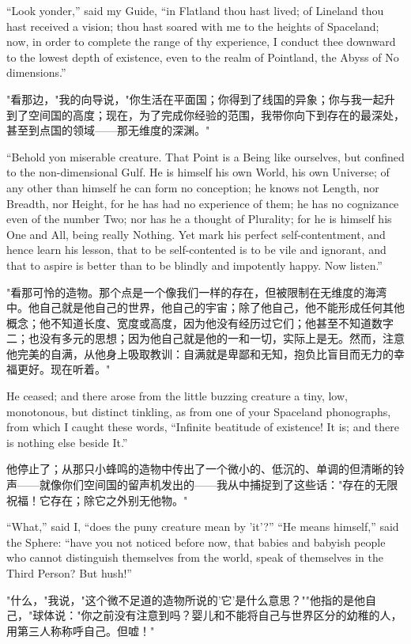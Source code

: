 \documentclass[12pt,UTF8]{ctexbook}
\begin{document}
``Look yonder,'' said my Guide, ``in Flatland thou hast lived; of Lineland thou hast received a vision; thou hast soared with me to the heights of Spaceland; now, in order to complete the range of thy experience, I conduct thee downward to the lowest depth of existence, even to the realm of Pointland, the Abyss of No dimensions.''

"看那边，"我的向导说，"你生活在平面国；你得到了线国的异象；你与我一起升到了空间国的高度；现在，为了完成你经验的范围，我带你向下到存在的最深处，甚至到点国的领域——那无维度的深渊。"

``Behold yon miserable creature. That Point is a Being like ourselves, but confined to the non-dimensional Gulf. He is himself his own World, his own Universe; of any other than himself he can form no conception; he knows not Length, nor Breadth, nor Height, for he has had no experience of them; he has no cognizance even of the number Two; nor has he a thought of Plurality; for he is himself his One and All, being really Nothing. Yet mark his perfect self-contentment, and hence learn his lesson, that to be self-contented is to be vile and ignorant, and that to aspire is better than to be blindly and impotently happy. Now listen.''

"看那可怜的造物。那个点是一个像我们一样的存在，但被限制在无维度的海湾中。他自己就是他自己的世界，他自己的宇宙；除了他自己，他不能形成任何其他概念；他不知道长度、宽度或高度，因为他没有经历过它们；他甚至不知道数字二；也没有多元的思想；因为他自己就是他的一和一切，实际上是无。然而，注意他完美的自满，从他身上吸取教训：自满就是卑鄙和无知，抱负比盲目而无力的幸福更好。现在听着。"

He ceased; and there arose from the little buzzing creature a tiny, low, monotonous, but distinct tinkling, as from one of your Spaceland phonographs, from which I caught these words, ``Infinite beatitude of existence! It is; and there is nothing else beside It.''

他停止了；从那只小蜂鸣的造物中传出了一个微小的、低沉的、单调的但清晰的铃声——就像你们空间国的留声机发出的——我从中捕捉到了这些话："存在的无限祝福！它存在；除它之外别无他物。"

``What,'' said I, ``does the puny creature mean by 'it'?'' ``He means himself,'' said the Sphere: ``have you not noticed before now, that babies and babyish people who cannot distinguish themselves from the world, speak of themselves in the Third Person? But hush!''

"什么，"我说，"这个微不足道的造物所说的'它'是什么意思？""他指的是他自己，"球体说："你之前没有注意到吗？婴儿和不能将自己与世界区分的幼稚的人，用第三人称称呼自己。但嘘！"
\end{document}
